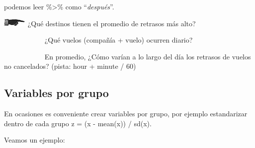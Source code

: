 \documentclass[
]{book}
\begin{document}
podemos leer \%\textgreater\% como ``\emph{después}''.

\includegraphics{imagenes/manicule2.jpg} ¿Qué destinos tienen el promedio de retrasos más
alto?

~~~~~~~~~~~ ¿Qué vuelos
(compañía + vuelo) ocurren diario?

~~~~~~~~~~~ En promedio,
¿Cómo varían a lo largo del día los retrasos de vuelos no cancelados? (pista: hour +
minute / 60)

\hypertarget{variables-por-grupo}{%
\subsection*{Variables por grupo}\label{variables-por-grupo}}

En ocasiones es conveniente crear variables por grupo, por ejemplo estandarizar
dentro de cada grupo z = (x - mean(x)) / sd(x).

Veamos un ejemplo:
\end{document}
